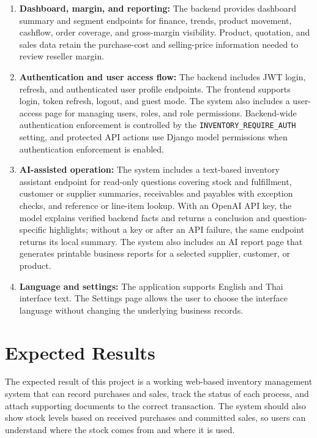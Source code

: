 \begin{enumerate}
	\item \textbf{Dashboard, margin, and reporting:} The backend provides dashboard summary and segment endpoints for finance, trends, product movement, cashflow, order coverage, and gross-margin visibility. Product, quotation, and sales data retain the purchase-cost and selling-price information needed to review reseller margin.
	
	\item \textbf{Authentication and user access flow:} The backend includes JWT login, refresh, and authenticated user profile endpoints. The frontend supports login, token refresh, logout, and guest mode. The system also includes a user-access page for managing users, roles, and role permissions. Backend-wide authentication enforcement is controlled by the \texttt{INVENTORY\_REQUIRE\_AUTH} setting, and protected API actions use Django model permissions when authentication enforcement is enabled.
	
	\item \textbf{AI-assisted operation:} The system includes a text-based inventory assistant endpoint for read-only questions covering stock and fulfillment, customer or supplier summaries, receivables and payables with exception checks, and reference or line-item lookup. With an OpenAI API key, the model explains verified backend facts and returns a conclusion and question-specific highlights; without a key or after an API failure, the same endpoint returns its local summary. The system also includes an AI report page that generates printable business reports for a selected supplier, customer, or product.

	\item \textbf{Language and settings:} The application supports English and Thai interface text. The Settings page allows the user to choose the interface language without changing the underlying business records.
\end{enumerate}

\section{Expected Results}
The expected result of this project is a working web-based inventory management system that can record purchases and sales, track the status of each process, and attach supporting documents to the correct transaction. The system should also show stock levels based on received purchases and committed sales, so users can understand where the stock comes from and where it is used.

